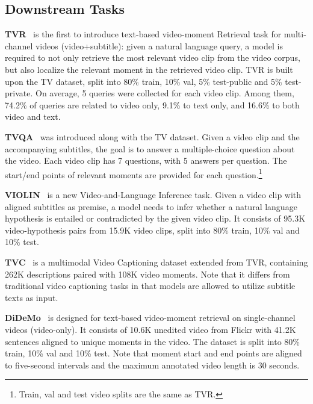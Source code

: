 \documentclass[11pt,a4paper]{article}
\makeatletter
\newcommand\footnoteref[1]{\protected@xdef\@thefnmark{\ref{#1}}\@footnotemark}
\makeatother
\begin{document}
\subsection{Downstream Tasks} \label{app:downstream_data}
\noindent \textbf{TVR}~\citep{lei2020tvr} is the first to introduce text-based video-moment Retrieval task for multi-channel videos (video+subtitle): given a natural language query, a model is required to not only retrieve the most relevant video clip from the video corpus, but also localize the relevant moment in the retrieved video clip. TVR is built upon the TV dataset, split into 80\% train, 10\% val, 5\% test-public and 5\% test-private. On average, 5 queries were collected for each video clip. Among them, 74.2\% of queries are related to video only, 9.1\% to text only, and 16.6\% to both video and text.

\vspace{5pt}
\noindent \textbf{TVQA}~\citep{lei2018tvqa} was introduced along with the TV dataset. Given a video clip and the accompanying subtitles, the goal is to answer a multiple-choice question about the video. Each video clip has 7 questions, with 5 answers per question. The start/end points of relevant moments are provided for each question.\footnote{\label{note:tv_split}Train, val and test video splits are the same as TVR.}

\vspace{5pt}
\noindent \textbf{VIOLIN}~\citep{liu2020violin} is a new Video-and-Language Inference task. Given a video clip with aligned subtitles as premise, a model needs to infer whether a natural language hypothesis is entailed
or contradicted by the given video clip. It consists of 95.3K video-hypothesis pairs from 15.9K video clips, split into 80\% train, 10\% val and 10\% test. 

\vspace{5pt}
\noindent \textbf{TVC}~\citep{lei2020tvr} is a multimodal Video Captioning dataset extended from TVR, containing 262K descriptions paired with 108K video moments.\footnoteref{note:tv_split}
Note that it differs from traditional video captioning tasks in that models are allowed to utilize subtitle texts as input.

\vspace{5pt}
\noindent \textbf{DiDeMo}~\citep{didemo} is designed for text-based video-moment retrieval on single-channel videos (video-only). It consists of 10.6K unedited video from Flickr with 41.2K sentences aligned to unique moments in the video. The dataset is split into 80\% train, 10\% val and 10\% test. Note that moment start and end points are aligned to five-second intervals and the maximum annotated video length is 30 seconds.
\end{document}
